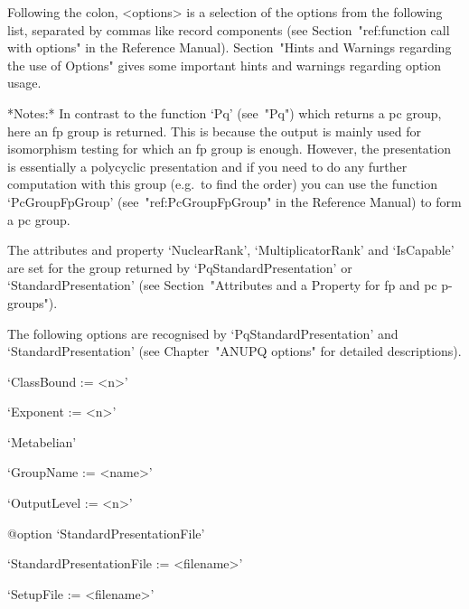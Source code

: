 Following the colon, <options> is a selection of  the  options  from  the
following  list,  separated  by  commas  like  record   components   (see
Section~"ref:function call with options" in the {\GAP} Reference Manual).
Section~"Hints and Warnings regarding the  use  of  Options"  gives  some
important hints and warnings regarding option usage.

*Notes:*
In contrast to the function `Pq' (see~"Pq") which  returns  a  pc  group,
here an fp group is returned. This is because the output is  mainly  used
for isomorphism testing for which an fp group  is  enough.  However,  the
presentation is essentially a polycyclic presentation and if you need  to
do any further computation with this group (e.g.~to find the  order)  you
can use the function `PcGroupFpGroup'  (see~"ref:PcGroupFpGroup"  in  the
{\GAP} Reference Manual) to form a pc group.

The  attributes  and  property  `NuclearRank',  `MultiplicatorRank'   and
`IsCapable' are set for the group returned by `PqStandardPresentation' or
`StandardPresentation' (see Section~"Attributes and a Property for fp and
pc p-groups").

The following options  are  recognised  by  `PqStandardPresentation'  and
`StandardPresentation'  (see   Chapter~"ANUPQ   options"   for   detailed
descriptions).

\beginlist%

\item{}`ClassBound := <n>'

\item{}`Exponent := <n>'

\item{}`Metabelian'

\item{}`GroupName := <name>'

\item{}`OutputLevel := <n>'

%
{@option \noexpand`StandardPresentationFile'}
\item{}`StandardPresentationFile := <filename>'

\item{}`SetupFile := <filename>'

